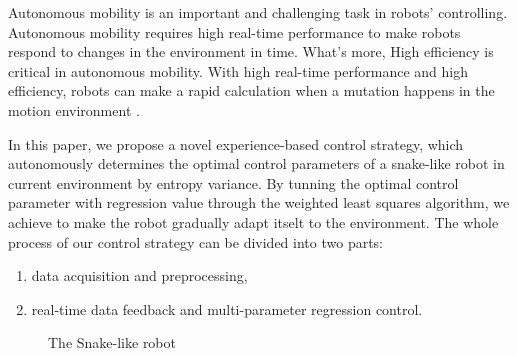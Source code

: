 Autonomous mobility is an important and challenging task in robots' controlling.  Autonomous mobility requires high real-time performance to make robots respond to changes in the environment in time. What's more, High efficiency is critical in autonomous mobility. With high real-time performance and high efficiency, robots can make a rapid calculation when a mutation happens in the motion environment .   

In this paper, we propose a novel experience-based control strategy,
which autonomously determines the optimal control parameters of a snake-like robot in
current environment by entropy variance\cite{WaveformEntropyVariance}\cite{EntropyandVarianceasRiskMeasure}\cite{UsingEntropyAndVariance}. By tunning the optimal control parameter with regression value through the weighted least squares algorithm\cite{gradientMethod}\cite{MSEestimates}, we achieve to make the robot gradually adapt itselt to the environment. The whole process of our control strategy can be divided into two parts:
\begin{enumerate}
	\item data acquisition and preprocessing,
	\item real-time data feedback and multi-parameter regression control.
\end{enumerate}
\begin{figure}[!t]
	\centering
	\caption{The Snake-like robot}
\end{figure}
